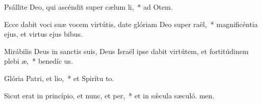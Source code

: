 \item Psállite Deo, qui ascéndit super cælum li,~* ad Otem.
\item Ecce dabit voci suæ vocem virtútis, date glóriam Deo super raël,~* magnificéntia ejus, et virtus ejus  bibus.
\item Mirábilis Deus in sanctis suis, Deus Israël ipse dabit virtútem, et fortitúdinem plebi æ,~* benedíc us.
\item Glória Patri, et lio,~* et Spirítu to.
\item Sicut erat in princípio, et nunc, et per,~* et in sǽcula sæculó. men.
